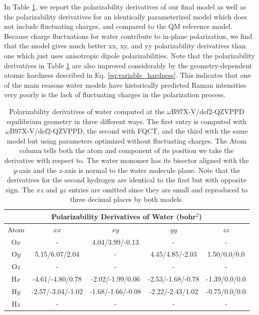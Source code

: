 \documentclass[journal=jctcce,manuscript=article]{achemso}
\begin{document}
In Table \ref{tab:pol_derivs}, we report the polarizability derivatives of our final model as well as the polarizability derivatives for an identically parameterized model which does not include fluctuating charges, and compared to the QM reference model. Because charge fluctuations for water contribute to in-plane polarization, we find that the model gives much better xx, xy, and yy polarizability derivatives than one which just uses anisotropic dipole polarizabilities. Note that the polarizability derivatives in Table \ref{tab:pol_derivs} are also improved considerably by the geometry-dependent atomic hardness described in Eq. \ref{eq:variable_hardness}. This indicates that one of the main reasons water models have historically predicted Raman intensities very poorly\cite{hamm20142d} is the lack of fluctuating charges in the polarization process. 

\begin{table}[ht!]
  \begin{center}
  \begin{tabular}{ccccc}
      \multicolumn{5}{c}{Polarizability Derivatives of Water (bohr$^2$)} \\\hline
       Atom & $xx$ & $xy$ & $yy$ & $zz$ \\\hline
       O$x$ & -                 & 4.04/3.99/-0.13    & -                  & -  \\
       O$y$ & 5.15/6.07/2.04    & -                  & 4.45/4.85/-2.03    & 1.50/0.0/0.0  \\
       O$z$ & -                 & -                  & -                  & -  \\
       H$x$ & -4.61/-4.80/0.78  & -2.02/-1.99/0.06   & -2.53/-1.68/-0.78  & -1.39/0.0/0.0  \\
       H$y$ & -2.57/-3.04/-1.02 & -1.68/-1.66/-0.08  & -2.22/-2.43/1.02   & -0.75/0.0/0.0  \\
       H$z$ & -                 & -                  & -                  & -  \\\hline
  \end{tabular}
  \end{center}
  \vspace{-3mm}
  \caption{Polarizability derivatives of water computed at the $\omega$B97X-V/def2-QZVPPD equilibrium geometry in three different ways. The first entry is computed with $\omega$B97X-V/def2-QZVPPD, the second with FQCT, and the third with the same model but using parameters optimized without fluctuating charges. The Atom column tells both the atom and component of its position we take the derivative with respect to. The water monomer has its bisector aligned with the $y$-axis and the $z$-axis is normal to the water molecule plane. Note that the derivatives for the second hydrogen are identical to the first but with opposite sign. The $xz$ and $yz$ entries are omitted since they are small and reproduced to three decimal places by both models.}
  \label{tab:pol_derivs}
\end{table}
\end{document}
